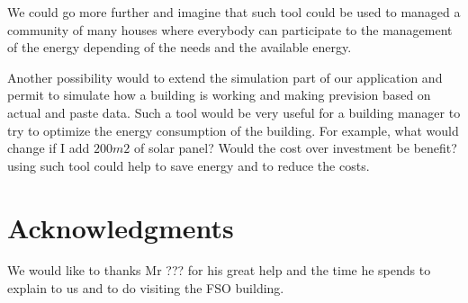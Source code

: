 \documentclass{acm_proc_article-sp}
\begin{document}
We could go more further and imagine that such tool could be used to managed a community of many houses where everybody can participate to the management of the energy depending of the needs and the available energy.

Another possibility would to extend the simulation part of our application and permit to simulate how a building is working and making prevision based on actual and paste data. Such a tool would be very useful for a building manager to try to optimize the energy consumption of the building. For example, what would change if I add $200m2$ of solar panel? Would the cost over investment be benefit? using such tool could help to save energy and to reduce the costs.



\section{Acknowledgments}
We would like to thanks Mr ??? for his great help and the time he spends to explain to us and to do visiting the FSO building.

%

\balancecolumns
\end{document}
